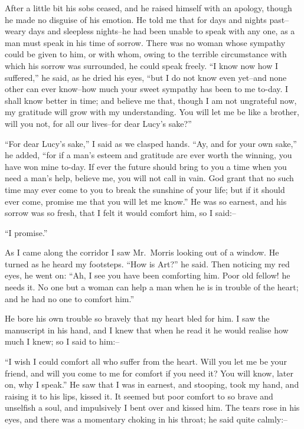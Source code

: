 \documentclass[12pt,openright]{book}
\begin{document}
After a little bit his sobs ceased, and he raised himself with an apology, though he made no disguise of his emotion. He told me that for days and nights past–weary days and sleepless nights–he had been unable to speak with any one, as a man must speak in his time of sorrow. There was no woman whose sympathy could be given to him, or with whom, owing to the terrible circumstance with which his sorrow was surrounded, he could speak freely. “I know now how I suffered,” he said, as he dried his eyes, “but I do not know even yet–and none other can ever know–how much your sweet sympathy has been to me to-day. I shall know better in time; and believe me that, though I am not ungrateful now, my gratitude will grow with my understanding. You will let me be like a brother, will you not, for all our lives–for dear Lucy’s sake?”

“For dear Lucy’s sake,” I said as we clasped hands. “Ay, and for your own sake,” he added, “for if a man’s esteem and gratitude are ever worth the winning, you have won mine to-day. If ever the future should bring to you a time when you need a man’s help, believe me, you will not call in vain. God grant that no such time may ever come to you to break the sunshine of your life; but if it should ever come, promise me that you will let me know.” He was so earnest, and his sorrow was so fresh, that I felt it would comfort him, so I said:–

“I promise.”

As I came along the corridor I saw Mr. Morris looking out of a window. He turned as he heard my footsteps. “How is Art?” he said. Then noticing my red eyes, he went on: “Ah, I see you have been comforting him. Poor old fellow! he needs it. No one but a woman can help a man when he is in trouble of the heart; and he had no one to comfort him.”

He bore his own trouble so bravely that my heart bled for him. I saw the manuscript in his hand, and I knew that when he read it he would realise how much I knew; so I said to him:–

“I wish I could comfort all who suffer from the heart. Will you let me be your friend, and will you come to me for comfort if you need it? You will know, later on, why I speak.” He saw that I was in earnest, and stooping, took my hand, and raising it to his lips, kissed it. It seemed but poor comfort to so brave and unselfish a soul, and impulsively I bent over and kissed him. The tears rose in his eyes, and there was a momentary choking in his throat; he said quite calmly:–
\end{document}
